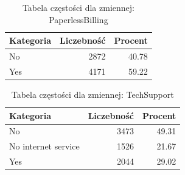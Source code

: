 \documentclass[12pt, a4paper]{article}\usepackage[]{graphicx}\usepackage[]{xcolor}
\begin{document}
\begin{table}[ht]
\centering
\caption{Tabela częstości dla zmiennej: PaperlessBilling} 
\label{tab:czest_PaperlessBilling}
\begin{tabular}{lrr}
  \hline
Kategoria & Liczebność & Procent \\ 
  \hline
No & 2872 & 40.78 \\ 
  Yes & 4171 & 59.22 \\ 
   \hline
\end{tabular}
\end{table}
\begin{table}[ht]
\centering
\caption{Tabela częstości dla zmiennej: TechSupport} 
\label{tab:czest_TechSupport}
\begin{tabular}{lrr}
  \hline
Kategoria & Liczebność & Procent \\ 
  \hline
No & 3473 & 49.31 \\ 
  No internet service & 1526 & 21.67 \\ 
  Yes & 2044 & 29.02 \\ 
   \hline
\end{tabular}
\end{table}



\clearpage
\end{document}
